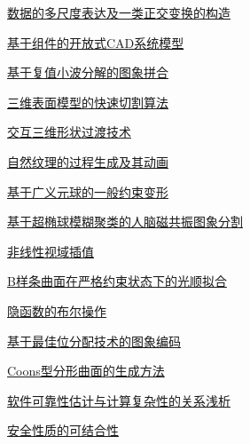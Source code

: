 \documentclass[a4paper]{article}
\begin{document}
\href{http://www.jos.org.cn/ch/reader/download_pdf.aspx?file_no=19980902&year_id=1998&quarter_id=9&falg=1}{数据的多尺度表达及一类正交变换的构造}

\href{http://www.jos.org.cn/ch/reader/download_pdf.aspx?file_no=19980903&year_id=1998&quarter_id=9&falg=1}{基于组件的开放式CAD系统模型}

\href{http://www.jos.org.cn/ch/reader/download_pdf.aspx?file_no=19980904&year_id=1998&quarter_id=9&falg=1}{基于复值小波分解的图象拼合}

\href{http://www.jos.org.cn/ch/reader/download_pdf.aspx?file_no=19980905&year_id=1998&quarter_id=9&falg=1}{三维表面模型的快速切割算法}

\href{http://www.jos.org.cn/ch/reader/download_pdf.aspx?file_no=19980906&year_id=1998&quarter_id=9&falg=1}{交互三维形状过渡技术}

\href{http://www.jos.org.cn/ch/reader/download_pdf.aspx?file_no=19980907&year_id=1998&quarter_id=9&falg=1}{自然纹理的过程生成及其动画}

\href{http://www.jos.org.cn/ch/reader/download_pdf.aspx?file_no=19980908&year_id=1998&quarter_id=9&falg=1}{基于广义元球的一般约束变形}

\href{http://www.jos.org.cn/ch/reader/download_pdf.aspx?file_no=19980909&year_id=1998&quarter_id=9&falg=1}{基于超椭球模糊聚类的人脑磁共振图象分割}

\href{http://www.jos.org.cn/ch/reader/download_pdf.aspx?file_no=19980910&year_id=1998&quarter_id=9&falg=1}{非线性视域插值}

\href{http://www.jos.org.cn/ch/reader/download_pdf.aspx?file_no=19980911&year_id=1998&quarter_id=9&falg=1}{B样条曲面在严格约束状态下的光顺拟合}

\href{http://www.jos.org.cn/ch/reader/download_pdf.aspx?file_no=19980912&year_id=1998&quarter_id=9&falg=1}{隐函数的布尔操作}

\href{http://www.jos.org.cn/ch/reader/download_pdf.aspx?file_no=19980913&year_id=1998&quarter_id=9&falg=1}{基于最佳位分配技术的图象编码}

\href{http://www.jos.org.cn/ch/reader/download_pdf.aspx?file_no=19980914&year_id=1998&quarter_id=9&falg=1}{Coons型分形曲面的生成方法}

\href{http://www.jos.org.cn/ch/reader/download_pdf.aspx?file_no=19980915&year_id=1998&quarter_id=9&falg=1}{软件可靠性估计与计算复杂性的关系浅析}

\href{http://www.jos.org.cn/ch/reader/download_pdf.aspx?file_no=19980916&year_id=1998&quarter_id=9&falg=1}{安全性质的可结合性}
\end{document}
